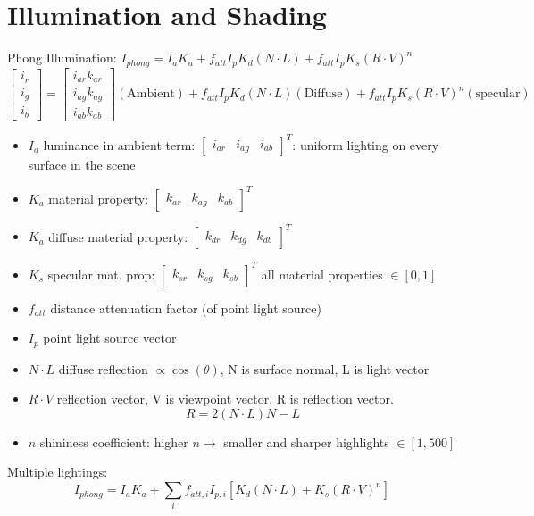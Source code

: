 \documentclass[10pt,twocolumn]{extarticle}
\begin{document}
\section*{Illumination and Shading}
Phong Illumination: $I_{phong} = I_aK_a + f_{att}I_pK_d(N\cdot L) + f_{att}I_pK_s(R\cdot V)^n$
\[\begin{bmatrix}
  i_r \\ 
  i_g \\ 
  i_b
\end{bmatrix} = \begin{bmatrix}
    i_{ar}k_{ar}\\i_{ag}k_{ag}\\i_{ab}k_{ab} 
  \end{bmatrix} (\text{Ambient}) + f_{att}I_pK_d(N\cdot L) (\text{Diffuse}) + f_{att}I_pK_s(R\cdot V)^n (\text{specular})
\]
\begin{itemize}
  \item $I_a$ luminance in ambient term: $\begin{bmatrix}
    i_{ar}&i_{ag}&i_{ab} 
  \end{bmatrix}^T$: uniform lighting on every surface in the scene
  \item $K_a$ material property: $\begin{bmatrix}
    k_{ar}&k_{ag}&k_{ab} 
  \end{bmatrix}^T$
  \item $K_a$ diffuse material property: $\begin{bmatrix}
    k_{dr}&k_{dg}&k_{db} 
  \end{bmatrix}^T $ 
  \item $K_s$ specular mat. prop: $\begin{bmatrix}
    k_{sr}&k_{sg}&k_{sb} 
  \end{bmatrix}^T $ all material properties $\in [0, 1]$
  \item $f_{att}$ distance attenuation factor (of point light source)
  \item $I_p$ point light source vector
  \item $N \cdot L$ diffuse reflection $\propto \cos(\theta)$, N is surface normal, L is light vector
  \item $R\cdot V$ reflection vector, V is viewpoint vector, R is reflection vector. \[R = 2(N\cdot L)N - L\]
  \item $n$ shininess coefficient: higher $n \rightarrow$ smaller and sharper highlights $\in [1, 500]$
\end{itemize}
Multiple lightings: \[I_{phong} = I_aK_a + \sum_i f_{att, i}I_{p, i}[K_d(N\cdot L) + K_s(R\cdot V)^n]\]
\end{document}
